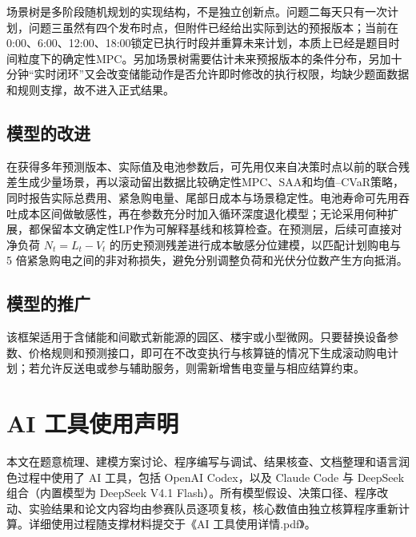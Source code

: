 \documentclass[withoutpreface,bwprint]{cumcmthesis}
\begin{document}
场景树是多阶段随机规划的实现结构，不是独立创新点。问题二每天只有一次计划，问题三虽然有四个发布时点，但附件已经给出实际到达的预报版本；当前在0:00、6:00、12:00、18:00锁定已执行时段并重算未来计划，本质上已经是题目时间粒度下的确定性MPC。另加场景树需要估计未来预报版本的条件分布，另加十分钟“实时闭环”又会改变储能动作是否允许即时修改的执行权限，均缺少题面数据和规则支撑，故不进入正式结果。



\subsection{模型的改进}

在获得多年预测版本、实际值及电池参数后，可先用仅来自决策时点以前的联合残差生成少量场景，再以滚动留出数据比较确定性MPC、SAA和均值--CVaR策略，同时报告实际总费用、紧急购电量、尾部日成本与场景稳定性。电池寿命可先用吞吐成本区间做敏感性，再在参数充分时加入循环深度退化模型；无论采用何种扩展，都保留本文确定性LP作为可解释基线和核算检查。在预测层，后续可直接对净负荷 $N_t=L_t-V_t$ 的历史预测残差进行成本敏感分位建模，以匹配计划购电与 5 倍紧急购电之间的非对称损失，避免分别调整负荷和光伏分位数产生方向抵消。

\subsection{模型的推广}

该框架适用于含储能和间歇式新能源的园区、楼宇或小型微网。只要替换设备参数、价格规则和预测接口，即可在不改变执行与核算链的情况下生成滚动购电计划；若允许反送电或参与辅助服务，则需新增售电变量与相应结算约束。

\section*{AI 工具使用声明}

本文在题意梳理、建模方案讨论、程序编写与调试、结果核查、文档整理和语言润色过程中使用了 AI 工具，包括 OpenAI Codex，以及 Claude Code 与 DeepSeek 组合（内置模型为 DeepSeek V4.1 Flash）。所有模型假设、决策口径、程序改动、实验结果和论文内容均由参赛队员逐项复核，核心数值由独立核算程序重新计算。详细使用过程随支撑材料提交于《AI 工具使用详情.pdf》。








\newpage
\end{document}
